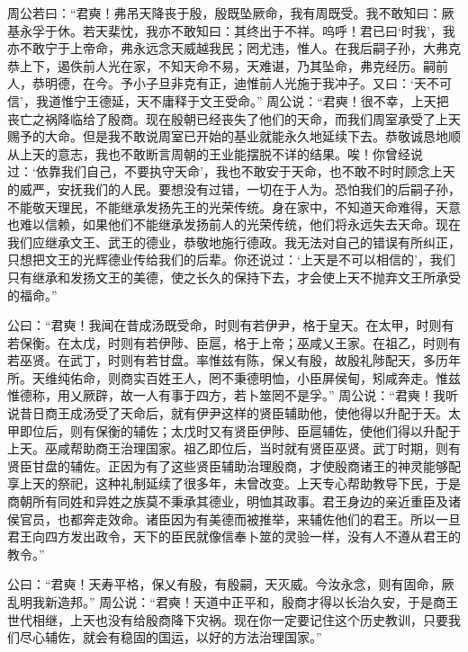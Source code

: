 \documentclass[a4paper,12pt,UTF8,twoside]{ctexbook}
\begin{document}
周公若曰：“君奭！弗吊天降丧于殷，殷既坠厥命，我有周既受。我不敢知曰：厥基永孚于休。若天棐忱，我亦不敢知曰：其终出于不祥。呜呼！君已曰‘时我’，我亦不敢宁于上帝命，弗永远念天威越我民；罔尤违，惟人。在我后嗣子孙，大弗克恭上下，遏佚前人光在家，不知天命不易，天难谌，乃其坠命，弗克经历。嗣前人，恭明德，在今。予小子旦非克有正，迪惟前人光施于我冲子。又曰：‘天不可信’，我道惟宁王德延，天不庸释于文王受命。”
周公说：“君奭！很不幸，上天把丧亡之祸降临给了殷商。现在殷朝已经丧失了他们的天命，而我们周室承受了上天赐予的大命。但是我不敢说周室已开始的基业就能永久地延续下去。恭敬诚恳地顺从上天的意志，我也不敢断言周朝的王业能摆脱不详的结果。唉！你曾经说过：‘依靠我们自己，不要执守天命’，我也不敢安于天命，也不敢不时时顾念上天的威严，安抚我们的人民。要想没有过错，一切在于人为。恐怕我们的后嗣子孙，不能敬天理民，不能继承发扬先王的光荣传统。身在家中，不知道天命难得，天意也难以信赖，如果他们不能继承发扬前人的光荣传统，他们将永远失去天命。现在我们应继承文王、武王的德业，恭敬地施行德政。我无法对自己的错误有所纠正，只想把文王的光辉德业传给我们的后辈。你还说过：‘上天是不可以相信的’，我们只有继承和发扬文王的美德，使之长久的保持下去，才会使上天不抛弃文王所承受的福命。”

公曰：“君奭！我闻在昔成汤既受命，时则有若伊尹，格于皇天。在太甲，时则有若保衡。在太戊，时则有若伊陟、臣扈，格于上帝；巫咸乂王家。在祖乙，时则有若巫贤。在武丁，时则有若甘盘。率惟兹有陈，保乂有殷，故殷礼陟配天，多历年所。天维纯佑命，则商实百姓王人，罔不秉德明恤，小臣屏侯甸，矧咸奔走。惟兹惟德称，用乂厥辟，故一人有事于四方，若卜筮罔不是孚。”
周公说：“君奭！我听说昔日商王成汤受了天命后，就有伊尹这样的贤臣辅助他，使他得以升配于天。太甲即位后，则有保衡的辅佐；太戊时又有贤臣伊陟、臣扈辅佐，使他们得以升配于上天。巫咸帮助商王治理国家。祖乙即位后，当时就有贤臣巫贤。武丁时期，则有贤臣甘盘的辅佐。正因为有了这些贤臣辅助治理殷商，才使殷商诸王的神灵能够配享上天的祭祀，这种礼制延续了很多年，未曾改变。上天专心帮助教导下民，于是商朝所有同姓和异姓之族莫不秉承其德业，明恤其政事。君王身边的亲近重臣及诸侯官员，也都奔走效命。诸臣因为有美德而被推举，来辅佐他们的君王。所以一旦君王向四方发出政令，天下的臣民就像信奉卜筮的灵验一样，没有人不遵从君王的教令。”

公曰：“君奭！天寿平格，保乂有殷，有殷嗣，天灭威。今汝永念，则有固命，厥乱明我新造邦。”
周公说：“君奭！天道中正平和，殷商才得以长治久安，于是商王世代相继，上天也没有给殷商降下灾祸。现在你一定要记住这个历史教训，只要我们尽心辅佐，就会有稳固的国运，以好的方法治理国家。”
\end{document}

